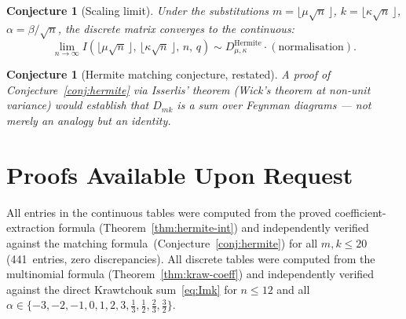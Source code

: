 \documentclass[11pt,a4paper]{article}
\theoremstyle{plain}
\newtheorem{conjecture}[theorem]{Conjecture}
\theoremstyle{definition}
\begin{document}
\begin{tcolorbox}[colback=blue!5, colframe=blue!5, boxrule=0pt,
  sharp corners]
\begin{conjecture}[Scaling limit]\label{conj:limit}
Under the substitutions $m = \lfloor \mu\sqrt{n}\,\rfloor$,
$k = \lfloor \kappa\sqrt{n}\,\rfloor$,
$\alpha = \beta/\sqrt{n}$, the discrete matrix converges to the
continuous:
\[
  \lim_{n \to \infty} I\!\left(\lfloor\mu\sqrt{n}\,\rfloor,\,
  \lfloor\kappa\sqrt{n}\,\rfloor,\, n,\, q\right)
  \sim D_{\mu,\kappa}^{\text{Hermite}}
  \cdot (\text{normalisation}).
\]
\end{conjecture}
\end{tcolorbox}

\begin{tcolorbox}[colback=blue!5, colframe=blue!5, boxrule=0pt,
  sharp corners]
\begin{conjecture}[Hermite matching conjecture, restated]
\label{conj:wick}
A proof of Conjecture~\ref{conj:hermite} via Isserlis' theorem
(Wick's theorem at non-unit variance) would establish that
$D_{mk}$ is a sum over Feynman diagrams --- not merely an analogy
but an identity.
\end{conjecture}
\end{tcolorbox}

\section{Proofs Available Upon Request}

All entries in the continuous tables were computed from the proved
coefficient-extraction formula (Theorem~\ref{thm:hermite-int}) and
independently verified against the matching
formula~(Conjecture~\ref{conj:hermite}) for all $m, k \le 20$
(441~entries, zero discrepancies). All discrete tables were computed
from the multinomial formula (Theorem~\ref{thm:kraw-coeff}) and
independently verified against the direct Krawtchouk
sum~\eqref{eq:Imk} for $n \le 12$ and all $\alpha \in \{-3, -2,
-1, 0, 1, 2, 3, \tfrac13, \tfrac12, \tfrac23, \tfrac32\}$.
\end{document}
